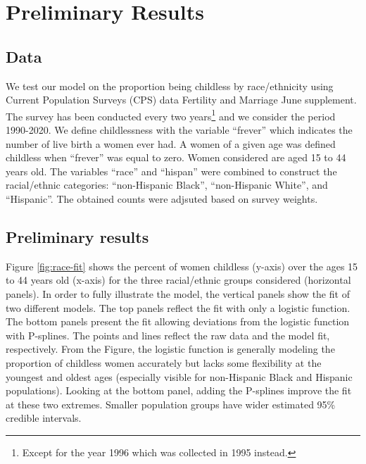\documentclass[
  11pt,
  letterpaper,
]{article}
\begin{document}
\hypertarget{preliminary-results}{%
\section{Preliminary Results}\label{preliminary-results}}

\hypertarget{data}{%
\subsection{Data}\label{data}}

We test our model on the proportion being childless by race/ethnicity using Current Population Surveys (CPS) data Fertility and Marriage June supplement. The survey has been conducted every two years\footnote{Except for the year 1996 which was collected in 1995 instead.} and we consider the period 1990-2020. We define childlessness with the variable ``frever'' which indicates the number of live birth a women ever had. A women of a given age was defined childless when ``frever'' was equal to zero. Women considered are aged 15 to 44 years old. The variables ``race'' and ``hispan'' were combined to construct the racial/ethnic categories: ``non-Hispanic Black'', ``non-Hispanic White'', and ``Hispanic''. The obtained counts were adjsuted based on survey weights.

\hypertarget{preliminary-results-1}{%
\subsection{Preliminary results}\label{preliminary-results-1}}

Figure \ref{fig:race-fit} shows the percent of women childless (y-axis) over the ages 15 to 44 years old (x-axis) for the three racial/ethnic groups considered (horizontal panels). In order to fully illustrate the model, the vertical panels show the fit of two different models. The top panels reflect the fit with only a logistic function. The bottom panels present the fit allowing deviations from the logistic function with P-splines. The points and lines reflect the raw data and the model fit, respectively. From the Figure, the logistic function is generally modeling the proportion of childless women accurately but lacks some flexibility at the youngest and oldest ages (especially visible for non-Hispanic Black and Hispanic populations). Looking at the bottom panel, adding the P-splines improve the fit at these two extremes. Smaller population groups have wider estimated 95\% credible intervals.
\end{document}
